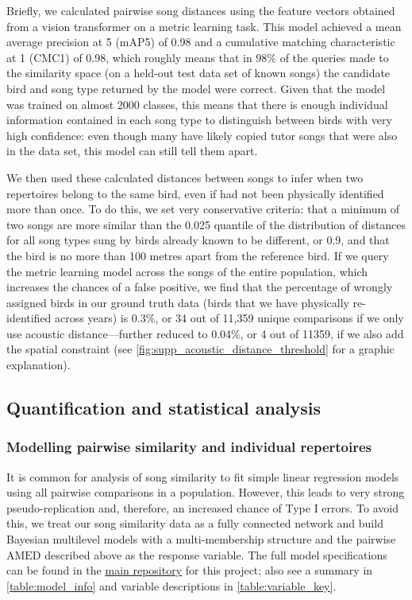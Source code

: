 \documentclass[9pt, onecolumn, twoside, lineno]{gsajnl}
\begin{document}
Briefly, we calculated pairwise song distances using the feature vectors obtained from a vision transformer on a metric learning task. This model achieved a mean average precision at 5 (mAP\@5) of 0.98 and a cumulative matching characteristic at 1 (CMC\@1) of 0.98, which roughly means that in 98\% of the queries made to the similarity space (on a held-out test data set of known songs) the candidate bird and song type returned by the model were correct. Given that the model was trained on almost 2000 classes, this means that there is enough individual information contained in each song type to distinguish between birds with very high confidence: even though many have likely copied tutor songs that were also in the data set, this model can still tell them apart.

We then used these calculated distances between songs to infer when two repertoires belong to the same bird, even if had not been physically identified more than once. To do this, we set very conservative criteria: that a minimum of two songs are more similar than the 0.025 quantile of the distribution of distances for all song types sung by birds already known to be different, or 0.9, and that the bird is no more than 100 metres apart from the reference bird. If we query the metric learning model across the songs of the entire population, which increases the chances of a false positive, we find that the percentage of wrongly assigned birds in our ground truth data (birds that we have physically re-identified across years) is 0.3\%, or 34 out of 11,359 unique comparisons if we only use acoustic distance---further reduced to 0.04\%, or 4 out of 11359, if we also add the spatial constraint (see \autoref{fig:supp_acoustic_distance_threshold} for a graphic explanation).

\subsection{Quantification and statistical analysis}

\subsubsection{Modelling pairwise similarity and individual repertoires}

It is common for analysis of song similarity to fit simple linear regression models using all pairwise comparisons in a population. However, this leads to very strong pseudo-replication and, therefore, an increased chance of Type I errors. To avoid this, we treat our song similarity data as a fully connected network and build Bayesian multilevel models with a multi-membership structure and the pairwise $\text{AMED}$ described above as the response variable. The full model specifications can be found in the \href{https://github.com/nilomr/birdsong-demography}{main repository} for this project; also see a summary in \autoref{table:model_info} and variable descriptions in \autoref{table:variable_key}.
\end{document}
